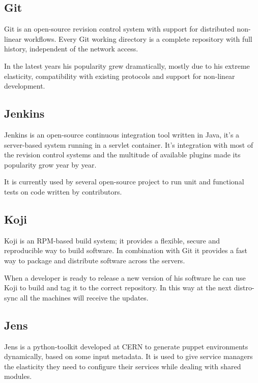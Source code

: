 \subsection{Git}

Git is an open-source revision control system with support for distributed
non-linear workflows. Every Git working directory is a complete repository
with full history, independent of the network access.

In the latest years his popularity grew dramatically, mostly due to his
extreme elasticity, compatibility with existing protocols and support for
non-linear development.

\subsection{Jenkins}

Jenkins is an open-source continuous integration tool written in Java,
it's a server-based system running in a servlet container. It's
integration with most of the revision control systems and the multitude of
available plugins made its popularity grow year by year.

It is currently used by several open-source project to run unit and
functional tests on code written by contributors.

\subsection{Koji}

Koji is an RPM-based build system; it provides a flexible, secure and
reproducible way to build software. In combination with Git it provides
a fast way to package and distribute software across the servers.

When a developer is ready to release a new version of his software he can
use Koji to build and tag it to the correct repository. In this way at the
next distro-sync all the machines will receive the updates.

\subsection{Jens}

Jens is a python-toolkit developed at CERN to generate puppet environments
dynamically, based on some input metadata. It is used to give service
managers the elasticity they need to configure their services while
dealing with shared modules.


